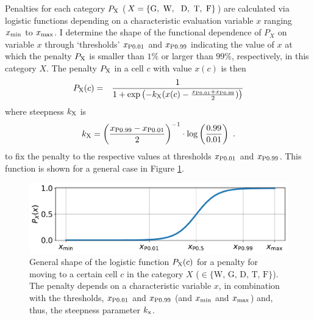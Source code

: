 Penalties for each category $P_{\rm X}$ ($X=\{\text{G,\, W, \, D,\, T,\, F}\}$) are calculated via logistic functions depending on a characteristic evaluation variable $x$ ranging $x_{\rm min}$ to $x_{\rm max}$.
I determine the shape of the functional dependence of $P_X$ on variable $x$ through `thresholds' $x_{\rm P0.01}$ and $x_{\rm P0.99}$ indicating the value of $x$ at which the penalty $P_{\rm X}$ is smaller than $1\%$ or larger than $99\%$, respectively, in this category $X$.
The penalty $P_{\rm X}$ in a cell $c$ with value $x(c)$ is then
\begin{eqnarray}\label{eq:P_X(c)}
	P_{\rm X}(c) & = & \frac{1}{1+\exp\left( - k_{\rm X} (x(c)-\frac{x_{\rm P0.01}+x_{\rm P0.99}}{2}) \right)} %
\end{eqnarray}
where steepness $k_{\rm X}$ is 
\begin{equation}\label{eq:k}
k_{\rm X} = \left(\frac{x_{\rm P0.99}-{x_{\rm P0.01}}}{2}\right)^{-1} \cdot \log\left(\frac{0.99}{0.01}\right) \ .
\end{equation}
to fix the penalty to the respective values at thresholds $x_{\rm P0.01}$ and $x_{\rm P0.99}$.
This function is shown for a general case in Figure \ref{fig:logF}.
\begin{figure}
	\centering
	\includegraphics[width=\textwidth]{images/general_logF.pdf}
	\caption{General shape of the logistic function $P_{\rm X}(c)$ for a penalty for moving to a certain cell $c$ in the category $X$ ($\in\{\text{W, G, D, T, F}\}$). The penalty depends on a characteristic variable $x$, in combination with the thresholds, $x_{\rm P0.01}$ and $x_{\rm P0.99}$ (and $x_{\rm min}$ and $x_{\rm max}$) and, thus, the steepness parameter $k_{\rm x}$.}
	\label{fig:logF}
\end{figure}
